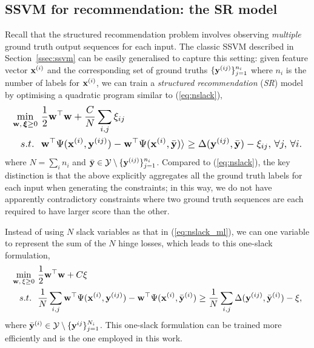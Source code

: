 \subsection{SSVM for recommendation: the SR model}
\label{ssec:sr}

Recall that the structured recommendation problem
involves observing \emph{multiple} ground truth output sequences for each input.
The classic SSVM described in Section~\ref{ssec:ssvm} can be easily generalised to capture this setting:
given feature vector $\mathbf{x}^{(i)}$ and the corresponding set of ground truths $\{\mathbf{y}^{(ij)}\}_{j=1}^{n_i}$
where $n_i$ is the number of labels for $\mathbf{x}^{(i)}$,
we can train a \emph{structured recommendation} (\emph{SR}) model by optimising a quadratic program similar to (\ref{eq:nslack}),
\begin{equation}
\label{eq:nslack_ml}
\resizebox{0.99\linewidth}{!}{$
\begin{aligned}
\min_{\w, \, \bm{\xi} \ge 0} ~& \frac{1}{2} \w^\top \w + \frac{C}{N} \sum_{i,j} \xi_{ij} \\
s.t.~ ~& \w^\top \Psi(\x^{(i)}, \y^{(ij)}) - \w^\top \Psi(\x^{(i)}, \bar{\y}) \rangle \ge
         \Delta(\y^{(ij)}, \bar{\y}) - \xi_{ij}, \, \forall j, \, \forall i.
\end{aligned}
$}
\end{equation}
where $N = \sum_i n_i$ and $\bar{\mathbf{y}} \in \mathcal{Y} \setminus \{\mathbf{y}^{(ij)}\}_{j=1}^{n_i}$.
Compared to (\ref{eq:nslack}), the key distinction is that the above
explicitly aggregates all the ground truth labels for each input when generating the constraints;
in this way, we do not have apparently contradictory constraints where
two ground truth sequences are each required to have larger score than the other.

Instead of using $N$ slack variables as that in (\ref{eq:nslack_ml}),
we can one variable to represent the sum of the $N$ hinge losses,
which leads to this one-slack formulation,
\begin{equation}
\label{eq:1slack_ml}
\resizebox{0.99\linewidth}{!}{$
\begin{aligned}
\min_{\w, \, \xi \ge 0} ~& \frac{1}{2} \w^\top \w + C \xi \\
s.t.~ ~& \frac{1}{N} \sum_{i,j} \w^\top \Psi(\x^{(i)}, \y^{(ij)}) - \w^\top \Psi(\x^{(i)}, \bar{\y}^{(i)}) \ge
         \frac{1}{N} \sum_{i,j} \Delta(\y^{(ij)}, \bar{\y}^{(i)}) - \xi,
\end{aligned}
$}
\end{equation}
where $\bar{\mathbf{y}}^{(i)} \in \mathcal{Y} \setminus \{\mathbf{y}^{ij}\}_{j=1}^{N_i}$.
This one-slack formulation can be trained more efficiently and is the one employed in this work.


